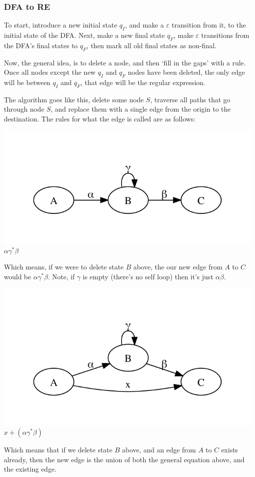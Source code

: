\subsubsection{DFA to RE}
To start, introduce a new initial state $q_I$, and make a $\varepsilon$ transition
from it, to the initial state of the DFA. Next, make a new final state $q_F$,
make $\varepsilon$ transitions from the DFA's final states to $q_F$, then
mark all old final states as non-final.

Now, the general idea, is to delete a node, and then `fill in the gaps' with a
rule. Once all nodes except the new $q_I$ and $q_F$ nodes have been deleted, the
only edge will be between $q_I$ and $q_F$, that edge will be the regular expression.

The algorithm goes like this, delete some node $S$, traverse all paths that
go through node $S$, and replace them with a single edge from the origin to 
the destination. The rules for what the edge is called are as follows:
\begin{center}
\includegraphics[trim=40 40 40 40,scale=0.6]{images/dfa_re_general}\\
$\alpha\gamma^*\beta$
\end{center}
Which means, if we were to delete state $B$ above, the our new edge from $A$ to
$C$ would be $\alpha\gamma^*\beta$. Note, if $\gamma$ is empty (there's no self loop)
then it's just $\alpha\beta$.

\begin{center}
\includegraphics[trim=40 40 40 40,scale=0.6]{images/dfa_re_general2}\\
$x+(\alpha\gamma^*\beta)$
\end{center}
Which means that if we delete state $B$ above, and an edge from $A$ to $C$ exists
already, then the new edge is the union of both the general equation above,
and the existing edge.

